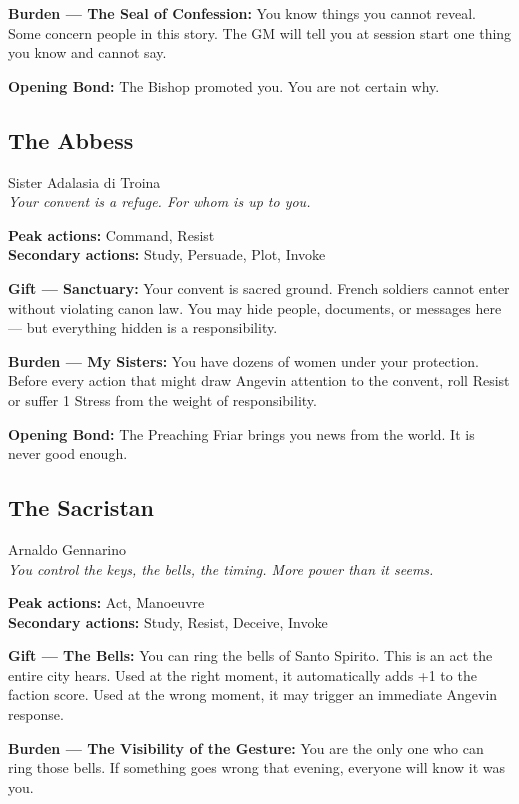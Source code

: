 \textbf{Burden --- The Seal of Confession:} You know things you cannot
reveal. Some concern people in this story. The GM will tell you at
session start one thing you know and cannot say.

\textbf{Opening Bond:} The Bishop promoted you.
You are not certain why.

\filetto

\subsection{The Abbess}
{\cinzel\footnotesize\color{grigionote} Sister Adalasia di Troina}\\
\textit{Your convent is a refuge. For whom is up to you.}

\textbf{Peak actions:} Command, Resist\\
\textbf{Secondary actions:} Study, Persuade, Plot, Invoke

\textbf{Gift --- Sanctuary:} Your convent is sacred ground. French
soldiers cannot enter without violating canon law. You may hide
people, documents, or messages here — but everything hidden is
a responsibility.

\textbf{Burden --- My Sisters:} You have dozens of women under your
protection. Before every action that might draw Angevin attention to
the convent, roll Resist or suffer 1 Stress from the weight of
responsibility.

\textbf{Opening Bond:} The Preaching Friar brings you news from
the world. It is never good enough.

\filetto

\subsection{The Sacristan}
{\cinzel\footnotesize\color{grigionote} Arnaldo Gennarino}\\
\textit{You control the keys, the bells, the timing. More power than it seems.}

\textbf{Peak actions:} Act, Manoeuvre\\
\textbf{Secondary actions:} Study, Resist, Deceive, Invoke

\textbf{Gift --- The Bells:} You can ring the bells of Santo Spirito.
This is an act the entire city hears. Used at the right moment, it
automatically adds +1 to the faction score. Used at the wrong moment,
it may trigger an immediate Angevin response.

\textbf{Burden --- The Visibility of the Gesture:} You are the only
one who can ring those bells. If something goes wrong that evening,
everyone will know it was you.

